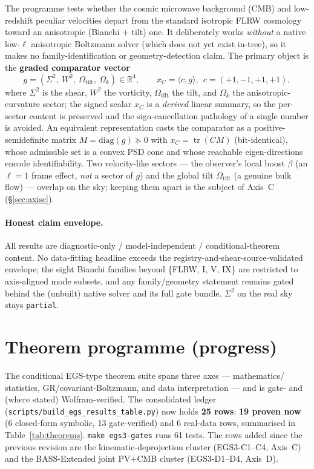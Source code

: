 \documentclass[11pt]{article}
\newcommand{\code}[1]{\texttt{\small #1}}
\newcommand{\Sig}{\Sigma^2}
\newcommand{\Wsq}{W^2}
\newcommand{\Otilt}{\Omega_{\mathrm{tilt}}}
\newcommand{\Ok}{\Omega_{k}}
\begin{document}
The programme tests whether the cosmic microwave background (CMB) and
low-redshift peculiar velocities depart from the standard isotropic FLRW
cosmology toward an anisotropic (Bianchi $+$ tilt) one. It deliberately works
\emph{without} a native low-$\ell$ anisotropic Boltzmann solver (which does not
yet exist in-tree), so it makes no family-identification or geometry-detection
claim. The primary object is the \textbf{graded comparator vector}
\begin{equation}
  g = (\Sig,\ \Wsq,\ \Otilt,\ \Ok) \in \mathbb{R}^4 ,
  \qquad x_C = \langle c, g\rangle,\ \ c=(+1,-1,+1,+1),
\end{equation}
where $\Sig$ is the shear, $\Wsq$ the vorticity, $\Otilt$ the tilt, and $\Ok$
the anisotropic-curvature sector; the signed scalar $x_C$ is a \emph{derived}
linear summary, so the per-sector content is preserved and the
sign-cancellation pathology of a single number is avoided. An equivalent
representation casts the comparator as a positive-semidefinite matrix
$M=\mathrm{diag}(g)\succeq 0$ with $x_C=\operatorname{tr}(CM)$ (bit-identical),
whose admissible set is a convex PSD cone and whose reachable eigen-directions
encode identifiability. Two velocity-like sectors --- the observer's local boost
$\beta$ (an $\ell=1$ frame effect, \emph{not} a sector of $g$) and the global
tilt $\Otilt$ (a genuine bulk flow) --- overlap on the sky; keeping them apart is
the subject of Axis~C (\S\ref{sec:axisc}).

\paragraph{Honest claim envelope.} All results are diagnostic-only /
model-independent / conditional-theorem content. No data-fitting headline
exceeds the registry-and-shear-source-validated envelope; the eight Bianchi
families beyond \{FLRW, I, V, IX\} are restricted to axis-aligned mode subsets,
and any family/geometry statement remains gated behind the (unbuilt) native
solver and its full gate bundle. $\Sig$ on the real sky stays \code{partial}.

\section{Theorem programme (progress)}\label{sec:theorems}

The conditional EGS-type theorem suite spans three axes --- mathematics/
statistics, GR/covariant-Boltzmann, and data interpretation --- and is gate- and
(where stated) Wolfram-verified. The consolidated ledger
(\code{scripts/build\_egs\_results\_table.py}) now holds \textbf{25 rows}:
\textbf{19 proven now} (6 closed-form symbolic, 13 gate-verified) and 6 real-data
rows, summarised in Table~\ref{tab:theorems}. \code{make egs3-gates} runs 61
tests. The rows added since the previous revision are the kinematic-deprojection
cluster (EGS3-C1--C4, Axis~C) and the BASS-Extended joint PV$+$CMB cluster
(EGS3-D1--D4, Axis~D).
\end{document}
